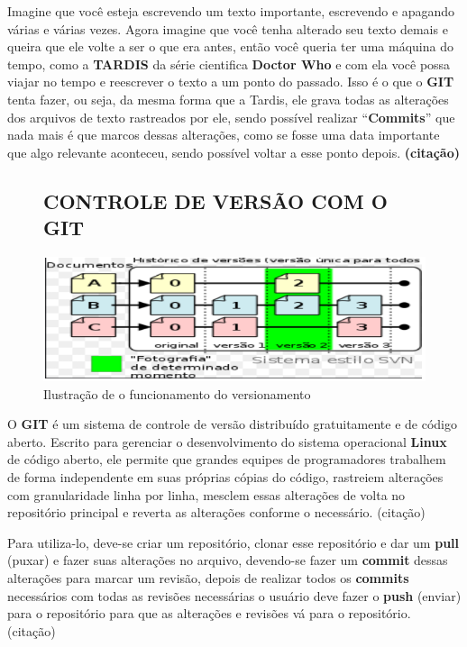 		Imagine que você esteja escrevendo um texto importante, escrevendo e apagando várias e várias vezes. Agora imagine que você tenha alterado seu texto demais e queira que ele volte a ser o que era antes, então você queria ter uma máquina do tempo, como a \textbf{TARDIS} da série cientifica \textbf{Doctor Who} e com ela você possa viajar no tempo e reescrever o texto a um ponto do passado. Isso é o que o \textbf{GIT} tenta fazer, ou seja, da mesma forma que a Tardis, ele grava todas as alterações dos arquivos de texto rastreados por ele, sendo possível realizar “\textbf{Commits}” que nada mais é que marcos dessas alterações, como se fosse uma data importante que algo relevante aconteceu, sendo possível voltar a esse ponto depois. \textbf{(citação)} 

\begin{figure}
	\subsection{CONTROLE DE VERSÃO COM O GIT}
	\label{sec:CONTROLEVERSAOGIT}

	\centering
	\caption{Ilustração de o funcionamento do versionamento}
	\centering
	\includegraphics[scale=0.75]{./images/Figure_1}	
	
	\label{fig:Fig1}
\end{figure}

O \textbf{GIT} é um sistema de controle de versão distribuído gratuitamente e de código aberto. Escrito para gerenciar o
desenvolvimento do sistema operacional \textbf{Linux} de código aberto,
ele permite que grandes equipes de programadores trabalhem de
forma independente em suas próprias cópias do código, rastreiem
alterações com granularidade linha por linha, mesclem essas
alterações de volta no repositório principal e reverta as 
alterações conforme o necessário. (citação) 	

Para utiliza-lo, deve-se criar um repositório, clonar esse repositório e dar um \textbf{pull} (puxar) e fazer suas alterações no arquivo, devendo-se fazer um \textbf{commit} dessas alterações para marcar um revisão, depois de realizar todos os \textbf{commits} necessários com todas as revisões necessárias o usuário deve fazer o \textbf{push} (enviar) para o repositório para que as alterações e revisões vá para o repositório. (citação) 

